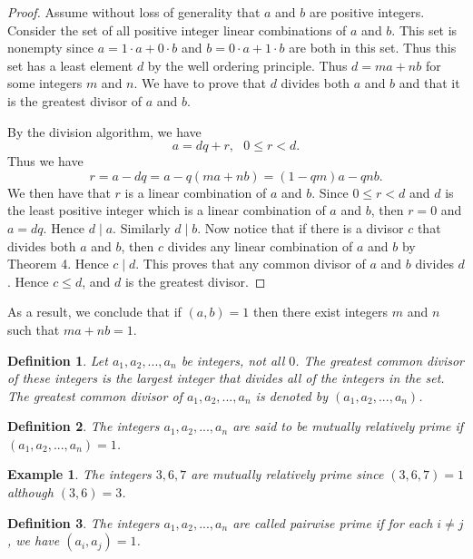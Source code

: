 \documentclass[12pt,letterpaper]{book}
\newtheorem{definition}{Definition}
\newtheorem{example}{Example}
\begin{document}
\begin{proof}  Assume without loss of generality that $a$ and $b$ are positive integers.
Consider the set of all positive integer linear combinations of $a$
and $b$. This set is nonempty since $a=1\cdot a+0\cdot b$ and $b=0\cdot a+1\cdot b$ are both
in this set. Thus this set has a least element $d$ by the
well ordering principle. Thus $d=ma+nb$ for some integers $m$ and
$n$.  We have to prove that $d$ divides both $a$ and $b$ and that it
is the greatest divisor of $a$ and $b$.
\par By the division algorithm, we have
\begin{equation*}
a=dq+r, \ \ \ 0\leq r<d.
\end{equation*}
Thus we have
\begin{equation*}
r=a-dq=a-q(ma+nb)=(1-qm)a-qnb.
\end{equation*}
We then have that $r$  is a linear combination of $a$ and $b$. Since
$0\leq r<d$ and $d$ is the least positive integer which is a linear
combination of $a$ and $b$, then $r=0$ and $a=dq$.  Hence $d\mid
a$.  Similarly $d\mid b$.  Now notice that if there is a divisor $c$
that divides both $a$ and $b$, then $c$ divides any linear
combination of $a$ and $b$ by Theorem 4.  Hence $c\mid d$. This
proves that any common divisor of $a$ and $b$ divides $d$. Hence
$c\leq d$, and $d$ is the greatest divisor.
\end{proof}

As a result, we conclude that if $(a,b)=1$ then there exist integers
$m$ and $n$ such that $ma+nb=1$.


\begin{definition}
Let $a_1,a_2,...,a_n$ be integers, not all $0$.  The greatest common
divisor of these integers is the largest integer that divides all of
the integers in the set.  The greatest common divisor of
$a_1,a_2,...,a_n$ is denoted by      $(a_1,a_2,...,a_n)$.
\end{definition}
\begin{definition}
The integers $a_1,a_2,...,a_n$ are said to be mutually relatively
prime if $(a_1,a_2,...,a_n)=1$.
\end{definition}

\begin{example}
The integers $3, 6, 7$ are mutually relatively prime since
$(3,6,7)=1$ although $(3,6)=3$.
\end{example}
\begin{definition}
The integers $a_1,a_2,...,a_n$ are called pairwise prime
if for each $i\neq j$, we have $(a_i,a_j)=1$.
\end{definition}
\end{document}
